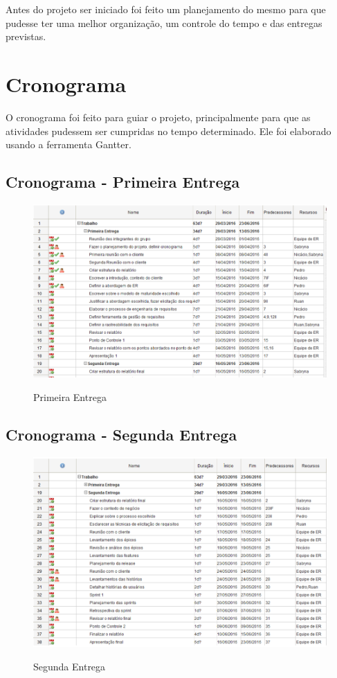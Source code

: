 Antes do projeto ser iniciado foi feito um planejamento do mesmo para que pudesse ter uma melhor organização, um controle do tempo e das entregas previstas.

\section{Cronograma}

O cronograma foi feito para guiar o projeto, principalmente para que as atividades pudessem ser cumpridas no tempo determinado. Ele foi elaborado usando a ferramenta Gantter.

\subsection{Cronograma - Primeira Entrega}

\FloatBarrier
\begin{figure}[!htpd]
		\centering
		\includegraphics[scale=0.5]{figuras/cron1}
		\label{img:Cronograma - Primeira Entrega}
		\caption{Primeira Entrega}
\end{figure}
\FloatBarrier

\subsection{Cronograma - Segunda Entrega}

\FloatBarrier
\begin{figure}[!htpd]
		\centering
		\includegraphics[scale=0.5]{figuras/cron2}
		\label{img:Cronograma - Segunda Entrega}
		\caption{Segunda Entrega}
\end{figure}
\FloatBarrier

